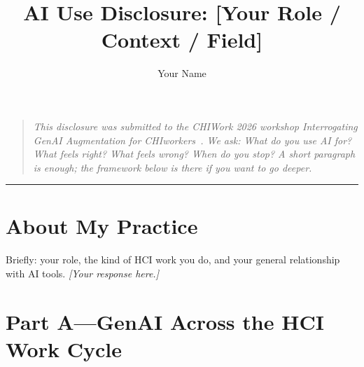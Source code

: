 \documentclass[sigconf]{acmart}
\title{AI Use Disclosure: [Your Role / Context / Field]}
\author{Your Name}
\affiliation{%
  \institution{Your Institution or Company}
  \city{City}
  \country{Country}}
\newcommand{\sectionrule}{\vspace{0.3em}\noindent\textcolor{workshopaccent}{\rule{\linewidth}{0.4pt}}\vspace{0.3em}}
\newcommand{\prompt}[1]{\vspace{0.5em}\noindent\textcolor{workshopaccent}{\small\sffamily #1}\vspace{0.3em}}
\newcommand{\response}{\vspace{0.3em}\noindent\textit{[Your response here.]}\vspace{0.5em}}
\begin{document}
\maketitle

\begin{quote}
\small\itshape
This disclosure was submitted to the CHIWork 2026 workshop
\emph{Interrogating GenAI Augmentation for CHIworkers}~\cite{sandhaus2026interrogating}.
We ask: What do you use AI for? What feels right? What feels wrong?
When do you stop? A short paragraph is enough; the framework below
is there if you want to go deeper.
\end{quote}

\sectionrule


\section*{About My Practice}

\prompt{Briefly: your role, the kind of HCI work you do, and your
general relationship with AI tools.}
\response

\section*{Part A\enspace—\enspace GenAI Across the HCI Work Cycle}
\end{document}
